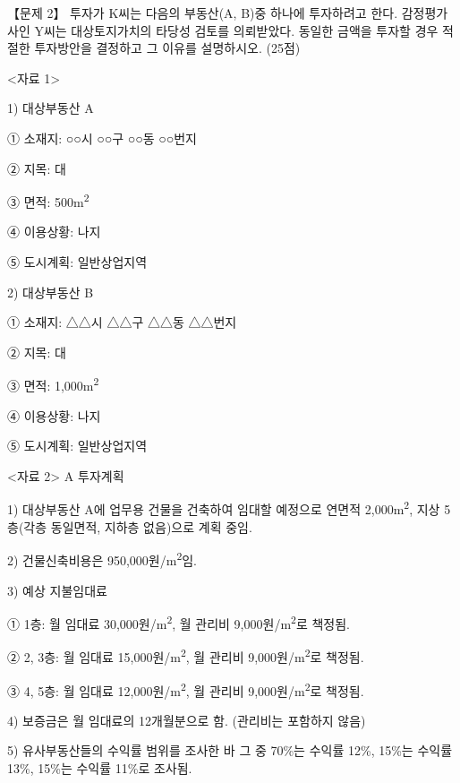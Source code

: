 \begin{longquestion}{【문제 2】}
투자가 K씨는 다음의 부동산(A, B)중 하나에 투자하려고 한다. 감정평가사인 Y씨는 대상토지가치의 타당성 검토를 의뢰받았다. 동일한 금액을 투자할 경우 적절한 투자방안을 결정하고 그 이유를 설명하시오. (25점) \par
<자료 1> \par
1) 대상부동산 A \par
① 소재지: ○○시 ○○구 ○○동 ○○번지 \par
② 지목: 대 \par
③ 면적: 500m\textsuperscript{2} \par
④ 이용상황: 나지 \par
⑤ 도시계획: 일반상업지역 \par
2) 대상부동산 B \par
① 소재지: △△시 △△구 △△동 △△번지 \par
② 지목: 대 \par
③ 면적: 1,000m\textsuperscript{2} \par
④ 이용상황: 나지 \par
⑤ 도시계획: 일반상업지역 \par
<자료 2> A 투자계획 \par
1) 대상부동산 A에 업무용 건물을 건축하여 임대할 예정으로 연면적 2,000m\textsuperscript{2}, 지상 5층(각층 동일면적, 지하층 없음)으로 계획 중임. \par
2) 건물신축비용은 950,000원/m\textsuperscript{2}임. \par
3) 예상 지불임대료 \par
① 1층: 월 임대료 30,000원/m\textsuperscript{2}, 월 관리비 9,000원/m\textsuperscript{2}로 책정됨. \par
② 2, 3층: 월 임대료 15,000원/m\textsuperscript{2}, 월 관리비 9,000원/m\textsuperscript{2}로 책정됨. \par
③ 4, 5층: 월 임대료 12,000원/m\textsuperscript{2}, 월 관리비 9,000원/m\textsuperscript{2}로 책정됨. \par
4) 보증금은 월 임대료의 12개월분으로 함. (관리비는 포함하지 않음) \par
5) 유사부동산들의 수익률 범위를 조사한 바 그 중 70\%는 수익률 12\%, 15\%는 수익률 13\%, 15\%는 수익률 11\%로 조사됨. \par

\end{longquestion}
